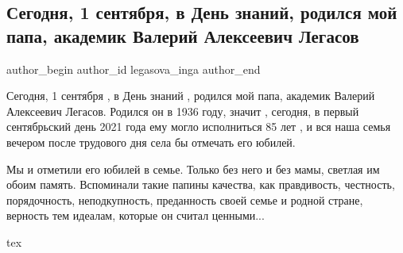  
 
 
 
 
 
\subsection{Сегодня, 1 сентября, в День знаний, родился мой папа, академик Валерий Алексеевич Легасов}
\label{sec:01_09_2021.fb.legasova_inga.1.birthday_valerij_legasov}
 
\ifcmt
 author_begin
   author_id legasova_inga
 author_end
\fi


Сегодня, 1 сентября , в День знаний , родился мой папа, академик Валерий
Алексеевич Легасов. Родился он в 1936 году, значит , сегодня, в первый
сентябрьский день 2021 года ему могло исполниться 85 лет , и вся наша семья
вечером после трудового дня села бы отмечать его юбилей. 

Мы и отметили его юбилей в семье. Только без него и без мамы, светлая им обоим
память. Вспоминали такие папины качества, как правдивость, честность,
порядочность, неподкупность, преданность своей семье и родной стране, верность
тем идеалам, которые он считал ценными...  



\ifcmt
  tex 
\fi

